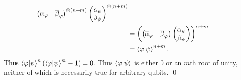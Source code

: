 \begin{parts}
\begin{solution}
\begin{align*}
\begin{pmatrix}
                \overline\alpha_\varphi & \overline\beta_\varphi
            \end{pmatrix}^{\otimes(n+m)}
            \begin{pmatrix}
                \alpha_\psi \\ \beta_\psi
            \end{pmatrix}^{\otimes(n+m)}
            \\
             & =
            \left(
            \begin{pmatrix}
                \overline\alpha_\varphi & \overline\beta_\varphi
            \end{pmatrix}
            \begin{pmatrix}
                \alpha_\psi \\ \beta_\psi
            \end{pmatrix}
            \right)^{n+m}
            \\
             & =
            \braket{\varphi|\psi}^{n+m}.
        \end{align*}
        Thus $\braket{\varphi|\psi}^n(\braket{\varphi|\psi}^m - 1) = 0$. Thus $\braket{\varphi|\psi}$ is either $0$ or an $m$th root of unity, neither of which is necessarily true for arbitrary qubits. \qed
    \end{solution}
\end{parts}


